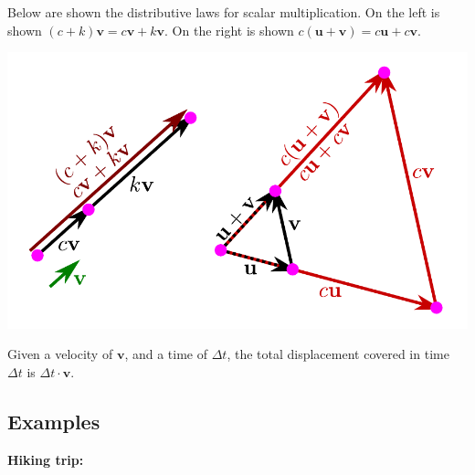 \documentclass{article}
\begin{document}
Below are shown the distributive laws for scalar multiplication. On the left is shown \((c + k)\mathbf{v} = c\mathbf{v} + k\mathbf{v}\). On the right is shown \(c(\mathbf{u} + \mathbf{v}) = c\mathbf{u} + c\mathbf{v}\).

\includegraphics[width = \textwidth]{distributive_laws}

Given a velocity of \(\mathbf{v}\), and a time of \(\Delta t\), the total displacement covered in time \(\Delta t\) is \(\Delta t \cdot \mathbf{v}\).



\subsection*{Examples}

\textbf{Hiking trip:}
\end{document}

